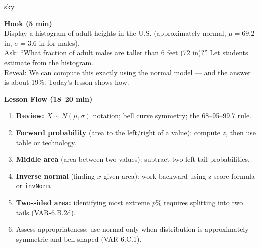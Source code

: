 \documentclass[10pt]{article}
\begin{document}
\begin{skillbox}{sky}
\begin{minipage}[t]{0.48\linewidth}
    \textbf{Hook (5 min)}\\
    Display a histogram of adult heights in the U.S. (approximately normal,
    $\mu = 69.2$ in, $\sigma = 3.6$ in for males).\\[4pt]
    Ask: ``What fraction of adult males are taller than 6 feet (72 in)?'' Let students
    estimate from the histogram.\\[4pt]
    Reveal: We can compute this exactly using the normal model --- and the answer is
    about 19\%. Today's lesson shows how.
\end{minipage}
\hfill
\begin{minipage}[t]{0.48\linewidth}
    \textbf{Lesson Flow (18--20 min)}
    \begin{enumerate}
        \item \textbf{Review:} $X \sim N(\mu, \sigma)$ notation; bell curve symmetry;
              the 68--95--99.7 rule.
        \item \textbf{Forward probability} (area to the left/right of a value):
              compute $z$, then use table or technology.
        \item \textbf{Middle area} (area between two values): subtract two left-tail
              probabilities.
        \item \textbf{Inverse normal} (finding $x$ given area): work backward using
              z-score formula or \texttt{invNorm}.
        \item \textbf{Two-sided area:} identifying most extreme $p\%$ requires
              splitting into two tails (VAR-6.B.2d).
        \item Assess appropriateness: use normal only when distribution is
              approximately symmetric and bell-shaped (VAR-6.C.1).
    \end{enumerate}
\end{minipage}
\end{skillbox}
\end{document}
